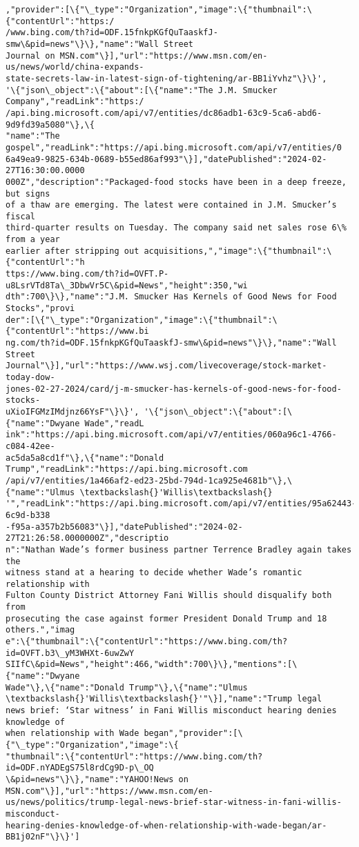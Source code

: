 \documentclass[11pt]{article}
\begin{document}
\begin{Verbatim}[commandchars=\\\{\}]
,"provider":[\{"\_type":"Organization","image":\{"thumbnail":\{"contentUrl":"https:/
/www.bing.com/th?id=ODF.15fnkpKGfQuTaaskfJ-smw\&pid=news"\}\},"name":"Wall Street
Journal on MSN.com"\}],"url":"https://www.msn.com/en-us/news/world/china-expands-
state-secrets-law-in-latest-sign-of-tightening/ar-BB1iYvhz"\}\}',
'\{"json\_object":\{"about":[\{"name":"The J.M. Smucker Company","readLink":"https:/
/api.bing.microsoft.com/api/v7/entities/dc86adb1-63c9-5ca6-abd6-9d9fd39a5080"\},\{
"name":"The gospel","readLink":"https://api.bing.microsoft.com/api/v7/entities/0
6a49ea9-9825-634b-0689-b55ed86af993"\}],"datePublished":"2024-02-27T16:30:00.0000
000Z","description":"Packaged-food stocks have been in a deep freeze, but signs
of a thaw are emerging. The latest were contained in J.M. Smucker’s fiscal
third-quarter results on Tuesday. The company said net sales rose 6\% from a year
earlier after stripping out acquisitions,","image":\{"thumbnail":\{"contentUrl":"h
ttps://www.bing.com/th?id=OVFT.P-u8LsrVTd8Ta\_3DbwVr5C\&pid=News","height":350,"wi
dth":700\}\},"name":"J.M. Smucker Has Kernels of Good News for Food Stocks","provi
der":[\{"\_type":"Organization","image":\{"thumbnail":\{"contentUrl":"https://www.bi
ng.com/th?id=ODF.15fnkpKGfQuTaaskfJ-smw\&pid=news"\}\},"name":"Wall Street
Journal"\}],"url":"https://www.wsj.com/livecoverage/stock-market-today-dow-
jones-02-27-2024/card/j-m-smucker-has-kernels-of-good-news-for-food-stocks-
uXioIFGMzIMdjnz66YsF"\}\}', '\{"json\_object":\{"about":[\{"name":"Dwyane Wade","readL
ink":"https://api.bing.microsoft.com/api/v7/entities/060a96c1-4766-c084-42ee-
ac5da5a8cd1f"\},\{"name":"Donald Trump","readLink":"https://api.bing.microsoft.com
/api/v7/entities/1a466af2-ed23-25bd-794d-1ca925e4681b"\},\{"name":"Ulmus \textbackslash{}'Willis\textbackslash{}
'","readLink":"https://api.bing.microsoft.com/api/v7/entities/95a62443-6c9d-b338
-f95a-a357b2b56083"\}],"datePublished":"2024-02-27T21:26:58.0000000Z","descriptio
n":"Nathan Wade’s former business partner Terrence Bradley again takes the
witness stand at a hearing to decide whether Wade’s romantic relationship with
Fulton County District Attorney Fani Willis should disqualify both from
prosecuting the case against former President Donald Trump and 18 others.","imag
e":\{"thumbnail":\{"contentUrl":"https://www.bing.com/th?id=OVFT.b3\_yM3WHXt-6uwZwY
SIIfC\&pid=News","height":466,"width":700\}\},"mentions":[\{"name":"Dwyane
Wade"\},\{"name":"Donald Trump"\},\{"name":"Ulmus \textbackslash{}'Willis\textbackslash{}'"\}],"name":"Trump legal
news brief: ‘Star witness’ in Fani Willis misconduct hearing denies knowledge of
when relationship with Wade began","provider":[\{"\_type":"Organization","image":\{
"thumbnail":\{"contentUrl":"https://www.bing.com/th?id=ODF.nYADEgS75l8rdCg9D-p\_OQ
\&pid=news"\}\},"name":"YAHOO!News on MSN.com"\}],"url":"https://www.msn.com/en-
us/news/politics/trump-legal-news-brief-star-witness-in-fani-willis-misconduct-
hearing-denies-knowledge-of-when-relationship-with-wade-began/ar-BB1j02nF"\}\}']
    \end{Verbatim}
\end{document}
